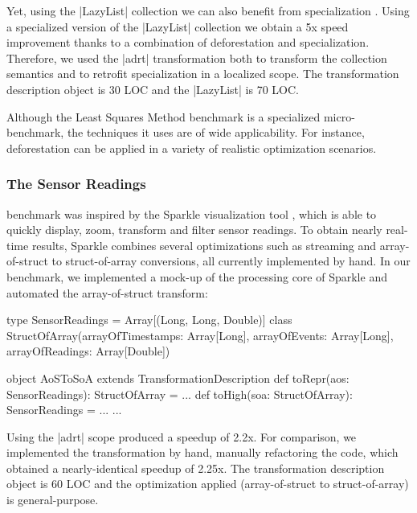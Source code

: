 Yet, using the |LazyList| collection we can also benefit from specialization \cite{iuli-thesis}. Using a specialized version of the |LazyList| collection we obtain a 5x speed improvement thanks to a combination of deforestation and specialization. Therefore, we used the |adrt| transformation both to transform the collection semantics and to retrofit specialization in a localized scope. The transformation description object is 30 LOC and the |LazyList| is 70 LOC.

Although the Least Squares Method benchmark is a specialized micro-benchmark, the techniques it uses are of wide applicability. For instance, deforestation can be applied in a variety of realistic optimization scenarios.



\subsubsection{The Sensor Readings} benchmark was inspired by the Sparkle visualization tool \cite{sparkle}, which is able to quickly display, zoom, transform and filter sensor readings. To obtain nearly real-time results, Sparkle combines several optimizations such as streaming and array-of-struct to struct-of-array conversions, all currently implemented by hand. In our benchmark, we implemented a mock-up of the processing core of Sparkle and automated the array-of-struct transform:

\begin{lstlisting-nobreak}
type SensorReadings = Array[(Long, Long, Double)]
class StructOfArray(arrayOfTimestamps: Array[Long],
                           arrayOfEvents:     Array[Long],
                           arrayOfReadings:   Array[Double])

object AoSToSoA extends TransformationDescription {
  def toRepr(aos: SensorReadings): StructOfArray = ...
  def toHigh(soa: StructOfArray): SensorReadings = ...
  ...
}
\end{lstlisting-nobreak}

Using the |adrt| scope produced a
speedup of 2.2x.
For comparison, we implemented the transformation by hand, manually refactoring the code, which obtained a nearly-identical speedup of 2.25x.
The transformation description object is 60 LOC and the optimization applied (array-of-struct to struct-of-array) is general-purpose.


